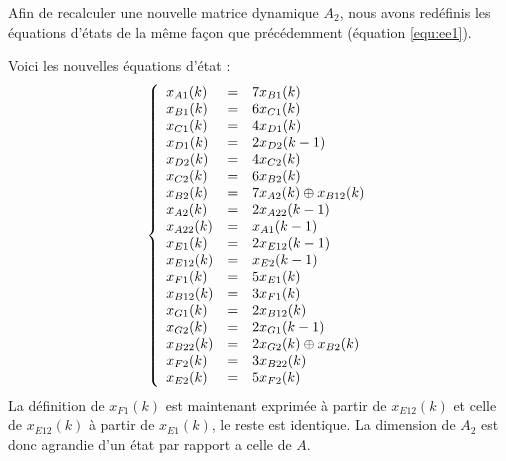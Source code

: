 Afin de recalculer une nouvelle matrice dynamique $A_2$, nous avons redéfinis les équations d'états de la même façon que précédemment (équation \ref{equ:ee1}). 

Voici les nouvelles équations d'état :
\begin{equation}
\label{equ:ee4}
\left\lbrace
\begin{array}{l c l}
x_{A1}(k) &=&	7x_{B1}(k)\\ 
x_{B1}(k) &=&	6x_{C1}(k)\\
x_{C1}(k) &=& 	4x_{D1}(k)\\
x_{D1}(k) &=&	2x_{D2}(k-1)\\
x_{D2}(k) &=&	4x_{C2}(k)\\
x_{C2}(k) &=&	6x_{B2}(k)\\
x_{B2}(k) &=&	7x_{A2}(k) \oplus x_{B12}(k)\\
x_{A2}(k) &=&	2x_{A22}(k-1)\\
x_{A22}(k) &=&	x_{A1}(k-1)\\
%
x_{E1}(k) &=&	2x_{E12}(k-1)\\
x_{E12}(k) &=&	x_{E2}(k-1)\\
x_{F1}(k) &=&	5x_{E1}(k)\\
x_{B12}(k) &=&	3x_{F1}(k)\\
x_{G1}(k) &=&	2x_{B12}(k)\\
x_{G2}(k) &=&	2x_{G1}(k-1)\\
x_{B22}(k) &=&	2x_{G2}(k) \oplus x_{B2}(k)\\
x_{F2}(k) &=&	3x_{B22}(k)\\
x_{E2}(k) &=&	5x_{F2}(k)   \\  
\end{array}
\right. 
\end{equation}
La définition de $x_{F1}(k)$ est maintenant exprimée à partir de $x_{E12}(k)$ et celle de $x_{E12}(k)$ à partir de $x_{E1}(k)$, le reste est identique.
La dimension de $A_2$ est donc agrandie d'un état par rapport a celle de $A$.

